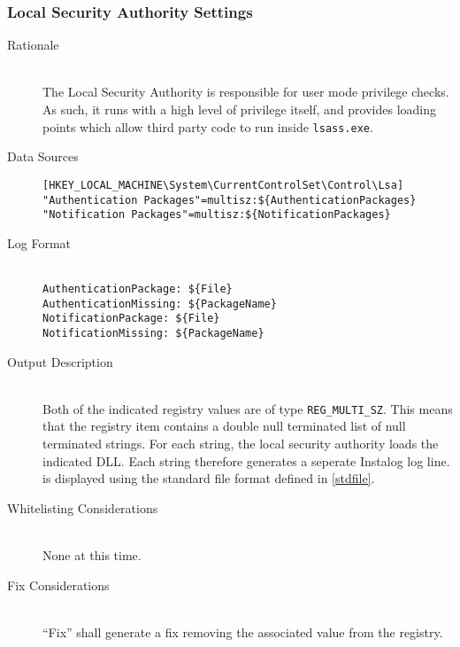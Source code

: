 \subsubsection{Local Security Authority Settings}
\begin{description}
\item[Rationale] \hfill \\
The Local Security Authority is responsible for user mode privilege checks. As
such, it runs with a high level of privilege itself, and provides loading points
which allow third party code to run inside \verb|lsass.exe|.
\item[Data Sources] \hfill
\vspace{-\baselineskip}
\begin{verbatim}
[HKEY_LOCAL_MACHINE\System\CurrentControlSet\Control\Lsa]
"Authentication Packages"=multisz:${AuthenticationPackages}
"Notification Packages"=multisz:${NotificationPackages}
\end{verbatim}
\item[Log Format] \hfill \\
\verb|AuthenticationPackage: ${File}| \\
\verb|AuthenticationMissing: ${PackageName}| \\
\verb|NotificationPackage: ${File}| \\
\verb|NotificationMissing: ${PackageName}| \\
\item[Output Description] \hfill \\
Both of the indicated registry values are of type \verb|REG_MULTI_SZ|. This
means that the registry item contains a double null terminated list of null
terminated strings. For each string, the local security authority loads the
indicated DLL. Each string therefore generates a seperate Instalog log line.
 is displayed using the standard file format defined in \ref{stdfile}.
\item[Whitelisting Considerations] \hfill \\
None at this time.
\item[Fix Considerations] \hfill \\
``Fix'' shall generate a fix removing the associated value from the registry.
\end{description}

